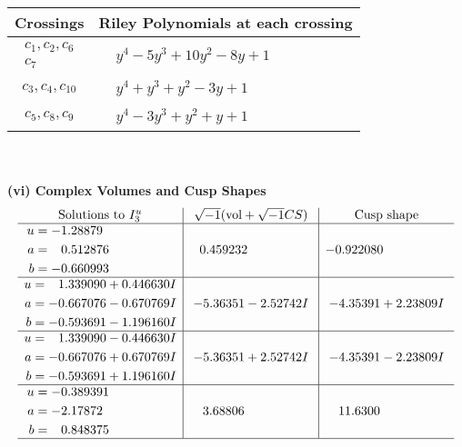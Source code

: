 \documentclass[1p]{elsarticle_modified}
\theoremstyle{definition}
\newcommand{\I}{\sqrt{-1}}
\begin{document}
\begin{tabular}{m{50pt}|m{274pt}}
Crossings & \hspace{64pt}Riley Polynomials at each crossing \\
\hline $$\begin{aligned}c_{1},c_{2},c_{6}\\c_{7}\end{aligned}$$&$\begin{aligned}
&y^4-5 y^3+10 y^2-8 y+1
\end{aligned}$\\
\hline $$\begin{aligned}c_{3},c_{4},c_{10}\end{aligned}$$&$\begin{aligned}
&y^4+y^3+y^2-3 y+1
\end{aligned}$\\
\hline $$\begin{aligned}c_{5},c_{8},c_{9}\end{aligned}$$&$\begin{aligned}
&y^4-3 y^3+y^2+y+1
\end{aligned}$\\
\hline
\end{tabular}\\~\\
\newpage\flushleft \textbf{(vi) Complex Volumes and Cusp Shapes}
$$\begin{array}{c|c|c}  
\text{Solutions to }I^u_{3}& \I (\text{vol} + \sqrt{-1}CS) & \text{Cusp shape}\\
 \hline 
\begin{aligned}
u &= -1.28879\phantom{ +0.000000I} \\
a &= \phantom{-}0.512876\phantom{ +0.000000I} \\
b &= -0.660993\phantom{ +0.000000I}\end{aligned}
 & \phantom{-}0.459232\phantom{ +0.000000I} & -0.922080\phantom{ +0.000000I} \\ \hline\begin{aligned}
u &= \phantom{-}1.339090 + 0.446630 I \\
a &= -0.667076 - 0.670769 I \\
b &= -0.593691 - 1.196160 I\end{aligned}
 & -5.36351 - 2.52742 I & -4.35391 + 2.23809 I \\ \hline\begin{aligned}
u &= \phantom{-}1.339090 - 0.446630 I \\
a &= -0.667076 + 0.670769 I \\
b &= -0.593691 + 1.196160 I\end{aligned}
 & -5.36351 + 2.52742 I & -4.35391 - 2.23809 I \\ \hline\begin{aligned}
u &= -0.389391\phantom{ +0.000000I} \\
a &= -2.17872\phantom{ +0.000000I} \\
b &= \phantom{-}0.848375\phantom{ +0.000000I}\end{aligned}
 & \phantom{-}3.68806\phantom{ +0.000000I} & \phantom{-}11.6300\phantom{ +0.000000I}\\
 \hline 
 \end{array}$$\newpage\newpage\renewcommand{\arraystretch}{1}
\end{document}
